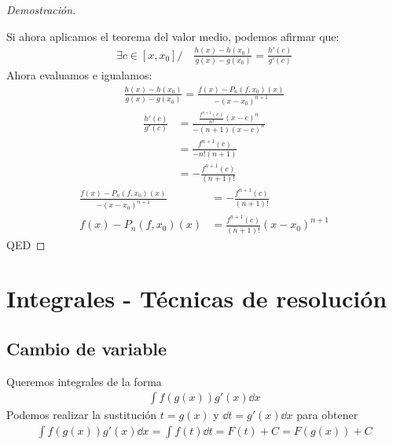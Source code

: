 \documentclass{article}
\begin{document}
\begin{proof}[Demostración]
\begin{itemize}
    \end{itemize}
    Si ahora aplicamos el teorema del valor medio, podemos afirmar que:
    \begin{equation}
        \begin{split}
            \exists c \in [x,x_{0}] / \quad \frac{h(x)-h(x_{0})}{g(x)-g(x_{0})} = \frac{h'(c)}{g'(c)}
        \end{split}
    \end{equation}
    Ahora evaluamos e igualamos:
    \begin{equation}
        \begin{split}
            \frac{h(x)-h(x_{0})}{g(x)-g(x_{0})} = \frac{f(x)- P_{n}(f,x_{0})(x)}{-(x-x_{0})^{n+1}}
        \end{split}
    \end{equation}
    \begin{equation}
        \begin{split}
            \frac{h'(c)}{g'(c)} &= \frac{\frac{f^{n+1}(c)}{n!}(x-c)^{n}}{-(n+1)(x-c)^{n}}\\
            &= \frac{f^{n+1}(c)}{-n!(n+1)} \\
            &= -\frac{f^{n+1}(c)}{(n+1)!}
        \end{split}
    \end{equation}
    \begin{equation}
        \begin{split}
            \frac{f(x)- P_{n}(f,x_{0})(x)}{-(x-x_{0})^{n+1}} &= -\frac{f^{n+1}(c)}{(n+1)!}\\
            f(x)- P_{n}(f,x_{0})(x) &= \frac{f^{n+1}(c)}{(n+1)!}(x-x_{0})^{n+1}
        \end{split}
    \end{equation}
    QED
\end{proof}
\section{Integrales - Técnicas de resolución}
\subsection{Cambio de variable}
Queremos integrales de la forma
\begin{equation}
    \begin{split}
        \int f(g(x))g'(x) \dd{x}
    \end{split}
\end{equation}
Podemos realizar la sustitución $t=g(x)$ y $\dd{t}=g'(x)\dd{x}$ para obtener
\begin{equation}
    \begin{split}
        \int f(g(x))g'(x) \dd{x} = \int f(t) \dd{t} = F(t)+C = F(g(x)) + C
    \end{split}
\end{equation}
\end{document}
